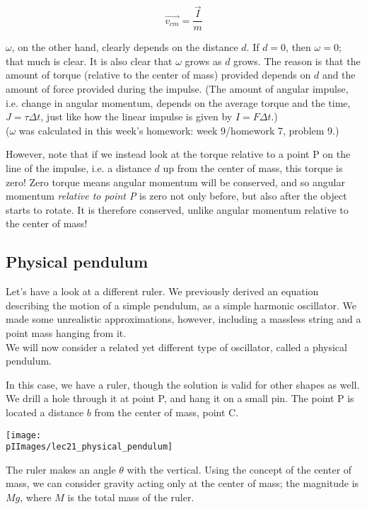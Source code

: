 \begin{equation}
\vec{v_{cm}} = \frac{\vec{I}}{m}
\end{equation}

$\omega$, on the other hand, clearly depends on the distance $d$. If $d = 0$, then $\omega = 0$; that much is clear. It is also clear that $\omega$ grows as $d$ grows. The reason is that the amount of torque (relative to the center of mass) provided depends on $d$ and the amount of force provided during the impulse. (The amount of angular impulse, i.e. change in angular momentum, depends on the average torque and the time, $J = \tau \Delta t$, just like how the linear impulse is given by $I = F \Delta t$.)\\
($\omega$ was calculated in this week's homework: week 9/homework 7, problem 9.)

However, note that if we instead look at the torque relative to a point P on the line of the impulse, i.e. a distance $d$ up from the center of mass, this torque is zero! Zero torque means angular momentum will be conserved, and so angular momentum \emph{relative to point P} is zero not only before, but also after the object starts to rotate. It is therefore conserved, unlike angular momentum relative to the center of mass!

\subsection{Physical pendulum}

Let's have a look at a different ruler. We previously derived an equation describing the motion of a simple pendulum, as a simple harmonic oscillator. We made some unrealistic approximations, however, including a massless string and a point mass hanging from it.\\
We will now consider a related yet different type of oscillator, called a physical pendulum.

In this case, we have a ruler, though the solution is valid for other shapes as well. We drill a hole through it at point P, and hang it on a small pin. The point P is located a distance $b$ from the center of mass, point C.

\begin{center}
\texttt{[image: \\pIImages/lec21\_physical\_pendulum]}
\end{center}

The ruler makes an angle $\theta$ with the vertical. Using the concept of the center of mass, we can consider gravity acting only at the center of mass; the magnitude is $M g$, where $M$ is the total mass of the ruler.

